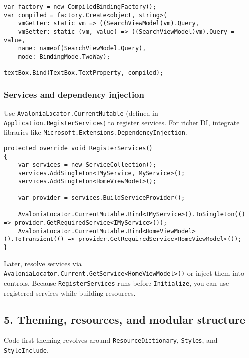 \begin{lstlisting}
var factory = new CompiledBindingFactory();
var compiled = factory.Create<object, string>(
    vmGetter: static vm => ((SearchViewModel)vm).Query,
    vmSetter: static (vm, value) => ((SearchViewModel)vm).Query = value,
    name: nameof(SearchViewModel.Query),
    mode: BindingMode.TwoWay);

textBox.Bind(TextBox.TextProperty, compiled);
\end{lstlisting}

\subsubsection{Services and dependency
injection}\label{services-and-dependency-injection}

Use \passthrough{\lstinline!AvaloniaLocator.CurrentMutable!} (defined in
\passthrough{\lstinline!Application.RegisterServices!}) to register
services. For richer DI, integrate libraries like
\passthrough{\lstinline!Microsoft.Extensions.DependencyInjection!}.

\begin{lstlisting}
protected override void RegisterServices()
{
    var services = new ServiceCollection();
    services.AddSingleton<IMyService, MyService>();
    services.AddSingleton<HomeViewModel>();

    var provider = services.BuildServiceProvider();

    AvaloniaLocator.CurrentMutable.Bind<IMyService>().ToSingleton(() => provider.GetRequiredService<IMyService>());
    AvaloniaLocator.CurrentMutable.Bind<HomeViewModel>().ToTransient(() => provider.GetRequiredService<HomeViewModel>());
}
\end{lstlisting}

Later, resolve services via
\passthrough{\lstinline!AvaloniaLocator.Current.GetService<HomeViewModel>()!}
or inject them into controls. Because
\passthrough{\lstinline!RegisterServices!} runs before
\passthrough{\lstinline!Initialize!}, you can use registered services
while building resources.

\subsection{5. Theming, resources, and modular
structure}\label{theming-resources-and-modular-structure}

Code-first theming revolves around
\passthrough{\lstinline!ResourceDictionary!},
\passthrough{\lstinline!Styles!}, and
\passthrough{\lstinline!StyleInclude!}.

